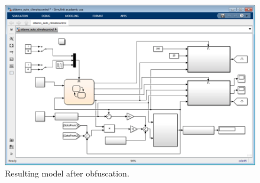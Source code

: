 \documentclass{article}
\begin{document}
\begin{figure}[htb]
	\centering
	\includegraphics[width=\textwidth]{../figs/Demo2}
	\caption{Resulting model after obfuscation.}
	\label{FIG:demo2}
\end{figure}
\end{document}
